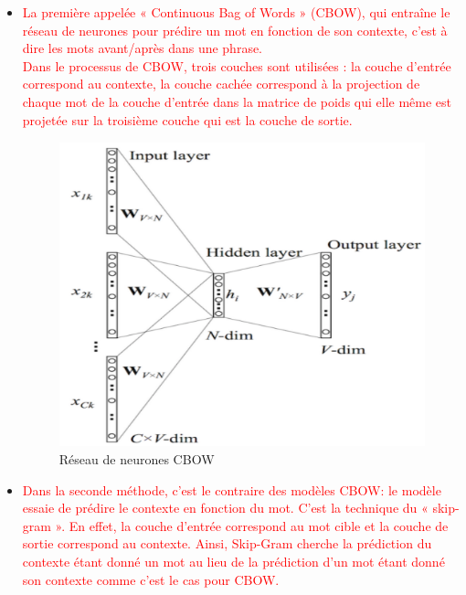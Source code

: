     \begin{itemize}
    \item  \textcolor{red}{La première appelée « Continuous Bag of Words » (CBOW), qui entraîne le réseau de neurones pour prédire un mot en fonction de son contexte, c’est à dire les mots avant/après dans une phrase.\\
    Dans le processus de CBOW, trois couches sont utilisées : la couche d'entrée correspond au contexte, la couche cachée correspond à la projection de chaque mot de la couche d'entrée dans la matrice de poids qui elle même  est projetée sur la troisième couche qui est la couche de sortie.\\ }
   
        \begin{figure}[H]
            \centering
            \includegraphics[height=250pt,width=300pt]{img/chapter2/Cbow.png}
            \caption{Réseau de neurones CBOW}
        \end{figure}
        
    
     \item  \textcolor{red}{Dans la seconde méthode, c'est le contraire des modèles CBOW: le modèle essaie de prédire le contexte en fonction du mot. C’est la technique du « skip-gram ». En effet, la couche d'entrée correspond au mot cible
     et la couche de sortie correspond au contexte. Ainsi, Skip-Gram cherche la prédiction du contexte étant donné un mot au lieu de la prédiction d'un mot étant donné son contexte comme c'est le cas pour CBOW.\\}
    

\end{itemize}
